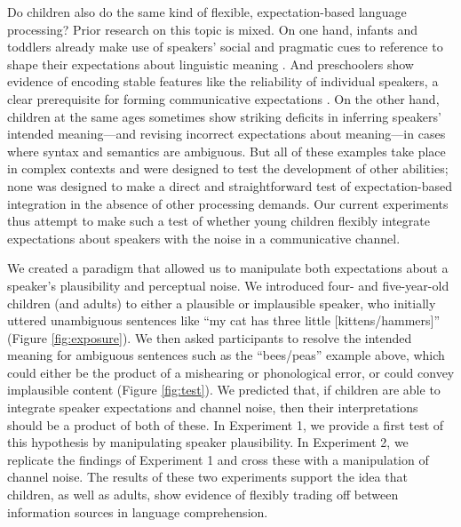 \documentclass[man,floatsintext]{apa6}
\begin{document}
Do children also do the same kind of flexible, expectation-based language processing? Prior research on this topic is mixed. On one hand, infants and toddlers already make use of speakers' social and pragmatic cues to reference to shape their expectations about linguistic meaning \cite{clark2009, carpenter1998}. And preschoolers show evidence of encoding stable features like the reliability of individual speakers, a clear prerequisite for forming communicative expectations \cite{koenig2004, harris2012}. On the other hand, children at the same ages sometimes show striking deficits in inferring speakers' intended meaning---and revising incorrect expectations about meaning---in cases where syntax \cite{trueswell1999} and semantics \cite{noveck2001} are ambiguous. But all of these examples take place in complex contexts and were designed to test the development of other abilities; none was designed to make a direct and straightforward test of expectation-based integration in the absence of other processing demands. Our current experiments thus attempt to make such a test of whether young children flexibly integrate expectations about speakers with the noise in a communicative channel. 

We created a paradigm that allowed us to manipulate both expectations about a speaker's plausibility and perceptual noise. We introduced four- and five-year-old children (and adults) to either a plausible or implausible speaker, who initially uttered unambiguous sentences like ``my cat has three little [kittens/hammers]'' (Figure \ref{fig:exposure}). We then asked participants to resolve the intended meaning for ambiguous sentences such as the ``bees/peas'' example above, which could either be the product of a mishearing or phonological error, or could convey implausible content (Figure \ref{fig:test}). We predicted that, if children are able to integrate speaker expectations and channel noise, then their interpretations should be a product of both of these. In Experiment 1, we provide a first test of this hypothesis by manipulating speaker plausibility. In Experiment 2, we replicate the findings of Experiment 1 and cross these with a manipulation of channel noise. The results of these two experiments support the idea that children, as well as adults, show evidence of flexibly trading off between information sources in language comprehension.
\end{document}
